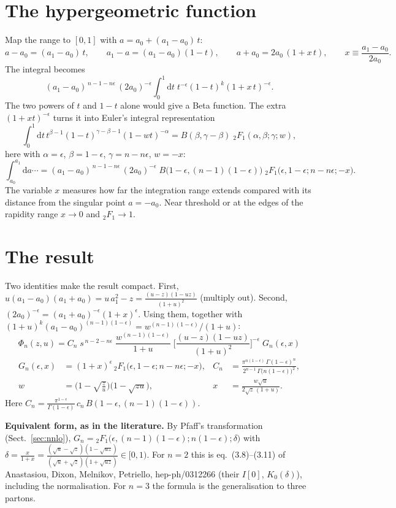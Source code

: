 \documentclass[11pt,a4paper]{article}
\newcommand{\ep}{\epsilon}
\newcommand{\dd}{\mathrm{d}}
\newcommand{\F}{{}_2F_1}
\newcommand{\note}[1]{\par\smallskip\noindent\colorbox{gray!12}{\parbox{\dimexpr\linewidth-2\fboxsep}{\small #1}}\par\smallskip}
\begin{document}
\section{The hypergeometric function}
\label{sec:hyp}
Map the range to $[0,1]$ with $a=a_0+(a_1-a_0)\,t$:
\[
  a-a_0=(a_1-a_0)\,t,\qquad a_1-a=(a_1-a_0)(1-t),\qquad a+a_0=2a_0\,(1+x\,t),\qquad x\equiv\frac{a_1-a_0}{2a_0}.
\]
The integral becomes
\[
  (a_1-a_0)^{\,n-1-n\ep}\,(2a_0)^{-\ep}\int_0^1\dd t\;t^{-\ep}(1-t)^{k}(1+x\,t)^{-\ep}.
\]
The two powers of $t$ and $1-t$ alone would give a Beta function. The extra $(1+xt)^{-\ep}$ turns it into Euler's
integral representation
\[
  \int_0^1\dd t\,t^{\beta-1}(1-t)^{\gamma-\beta-1}(1-wt)^{-\alpha}=B(\beta,\gamma-\beta)\;\F(\alpha,\beta;\gamma;w),
\]
here with $\alpha=\ep$, $\beta=1-\ep$, $\gamma=n-n\ep$, $w=-x$:
\begin{equation}
  \int_{a_0}^{a_1}\!\dd a\cdots=(a_1-a_0)^{\,n-1-n\ep}\,(2a_0)^{-\ep}\;
  B\big(1-\ep,(n-1)(1-\ep)\big)\;\F\big(\ep,1-\ep;n-n\ep;-x\big).
\end{equation}
The variable $x$ measures how far the integration range extends compared with its distance from the singular
point $a=-a_0$. Near threshold or at the edges of the rapidity range $x\to0$ and $\F\to1$.

\section{The result}
\label{sec:result}
Two identities make the result compact. First,
$u(a_1-a_0)(a_1+a_0)=u\,a_1^2-z=\frac{(u-z)(1-uz)}{(1+u)^2}$ (multiply out). Second,
$(2a_0)^{-\ep}=(a_1+a_0)^{-\ep}(1+x)^{\ep}$. Using them, together with
$(1+u)^k(a_1-a_0)^{(n-1)(1-\ep)}=w^{(n-1)(1-\ep)}/(1+u)$:
\begin{equation}
  \boxed{\;
  \Phi_n(z,u)=C_n\;s^{\,n-2-n\ep}\;\frac{w^{(n-1)(1-\ep)}}{1+u}\;
  \Big[\frac{(u-z)(1-uz)}{(1+u)^2}\Big]^{-\ep}\;G_n(\ep,x)\;}
  \label{eq:main}
\end{equation}
\begin{align}
  G_n(\ep,x)&=(1+x)^{\ep}\,\F\big(\ep,1-\ep;n-n\ep;-x\big), &
  C_n&=\frac{\pi^{n(1-\ep)}\,\Gamma(1-\ep)^n}{2^{n-1}\,\Gamma\big(n(1-\ep)\big)^2},\nonumber\\
  w&=\Big(1-\sqrt{\tfrac zu}\Big)\Big(1-\sqrt{zu}\Big), &
  x&=\frac{w\sqrt u}{2\sqrt z\,(1+u)} .
\end{align}
Here $C_n=\frac{\pi^{1-\ep}}{\Gamma(1-\ep)}\,c_n\,B(1-\ep,(n-1)(1-\ep))$.

\note{\textbf{Equivalent form, as in the literature.} By Pfaff's transformation (Sect.~\ref{sec:nnlo}),
$G_n=\F\big(\ep,(n-1)(1-\ep);n(1-\ep);\delta\big)$ with
$\delta=\frac{x}{1+x}=\frac{(\sqrt u-\sqrt z)(1-\sqrt{uz})}{(\sqrt u+\sqrt z)(1+\sqrt{uz})}\in[0,1)$. For $n=2$ this
is eq.~(3.8)--(3.11) of Anastasiou, Dixon, Melnikov, Petriello, hep-ph/0312266 (their $I[0]$, $K_0(\delta)$),
including the normalisation. For $n=3$ the formula is the generalisation to three partons.}
\end{document}
